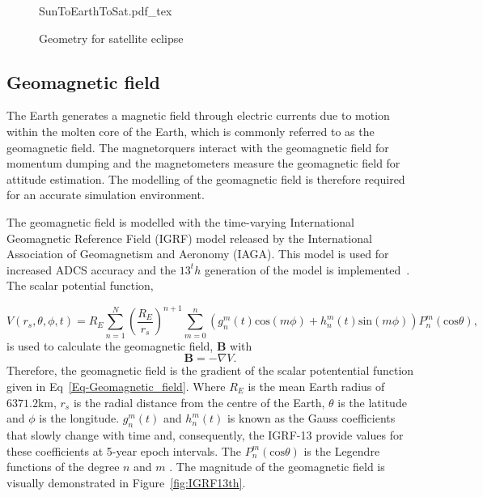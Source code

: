 \begin{figure}[!htb]
	\centering
	\def\svgwidth{12cm}
	{SunToEarthToSat.pdf_tex}
	\caption{Geometry for satellite eclipse}
	\label{fig:SunToEarthToSat}
\end{figure}


\subsection{Geomagnetic field}

The Earth generates a magnetic field through electric currents due to motion within the molten core of the Earth, which is commonly referred to as the geomagnetic field. The magnetorquers interact with the geomagnetic field for momentum dumping and the magnetometers measure the geomagnetic field for attitude estimation. The modelling of the geomagnetic field is therefore required for an accurate simulation environment.

The geomagnetic field is modelled with the time-varying International Geomagnetic Reference Field (IGRF) model released by the International Association of Geomagnetism and Aeronomy (IAGA). This model is used for increased ADCS accuracy and the $13^th$ generation of the model is implemented~\cite{alken2021international}. The scalar potential function,

\begin{equation}
\label{Eq-Geomagnetic_field}
V(r_s,\theta, \phi, t) = R_E \sum_{n=1}^{N}\left(\frac{R_E}{r_s}\right)^{n+1}\sum_{m=0}^{n}\left(g_n^m(t)\text{cos}(m\phi) + h_n^m(t)\text{sin}(m\phi)\right)P_n^m(\text{cos}\theta),
\end{equation}
is used to calculate the geomagnetic field, $\mathbf{B}$ with
\begin{equation}
\label{Eq-Geomagnetic_field_strength}
\mathbf{B} = - \nabla V.
\end{equation}
Therefore, the geomagnetic field is the gradient of the scalar potentential function given in Eq~\ref{Eq-Geomagnetic_field}. Where $R_E$ is the mean Earth radius of $\num{6371.2}$km, $r_s$ is the radial distance from the centre of the Earth, $\theta$ is the latitude and $\phi$ is the longitude. $g_n^m(t)$ and $h_n^m(t)$ is known as the Gauss coefficients that slowly change with time and, consequently, the IGRF-13 provide values for these coefficients at 5-year epoch intervals. The $P_n^m(\text{cos}\theta)$ is the Legendre functions of the degree $n$ and $m$ \cite{winch2005geomagnetism}. The magnitude of the geomagnetic field is visually demonstrated in Figure~\ref{fig:IGRF13th}.

